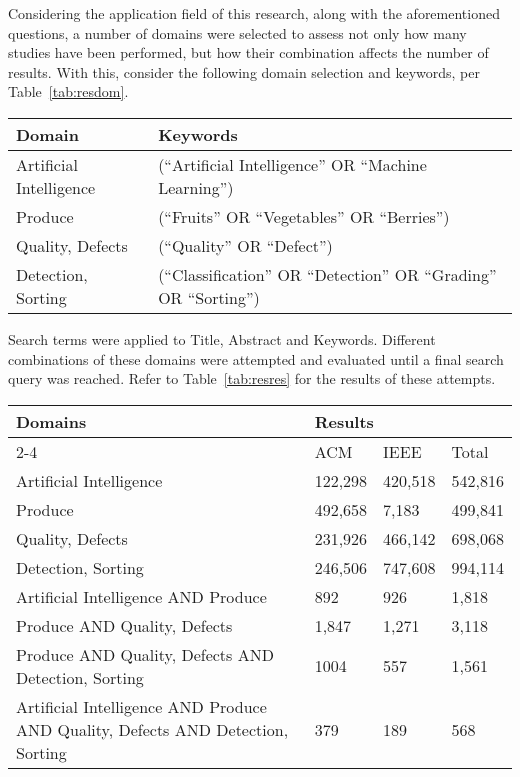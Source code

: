 \documentclass[conference]{IEEEtran}
\begin{document}
Considering the application field of this research, along with the aforementioned questions, a number of domains were selected to assess not only how many studies have been performed, but how their combination affects the number of results. With this, consider the following domain selection and keywords, per Table~\ref{tab:resdom}.

\begin{table*}
	\caption{Domains and keywords used to select search terms}
	\label{tab:resdom}
	\centering

	\begin{tabular}{ll}
	\hline
		Domain & Keywords \\
	\hline
		Artificial Intelligence & (``Artificial Intelligence'' OR ``Machine Learning'') \\
		Produce & (``Fruits'' OR ``Vegetables'' OR ``Berries'') \\
		Quality, Defects & (``Quality'' OR ``Defect'') \\
		Detection, Sorting & (``Classification'' OR ``Detection'' OR ``Grading'' OR ``Sorting'') \\
	\hline
	\end{tabular}
\end{table*}

Search terms were applied to Title, Abstract and Keywords. Different combinations of these domains were attempted and evaluated until a final search query was reached. Refer to Table~\ref{tab:resres} for the results of these attempts.

\begin{table*}[]
\caption{Combination of domains and respective results}
\label{tab:resres}
\begin{tabular}{llll}
\hline
\multirow{2}{*}{Domains}            & \multicolumn{3}{l}{Results} \\ \cline{2-4} 
                                    & ACM     & IEEE    & Total   \\ \hline
Artificial Intelligence             & 122,298 & 420,518 & 542,816 \\
Produce                             & 492,658 & 7,183   & 499,841 \\
Quality, Defects                    & 231,926 & 466,142 & 698,068 \\
Detection, Sorting                  & 246,506 & 747,608 & 994,114 \\
Artificial Intelligence AND Produce & 892     & 926     & 1,818   \\
Produce AND Quality, Defects        & 1,847   & 1,271   & 3,118   \\
Produce AND Quality, Defects AND Detection, Sorting                             & 1004 & 557 & 1,561 \\
Artificial Intelligence AND Produce AND Quality, Defects AND Detection, Sorting & 379  & 189 & 568   \\ \hline
\end{tabular}
\end{table*}
\end{document}
